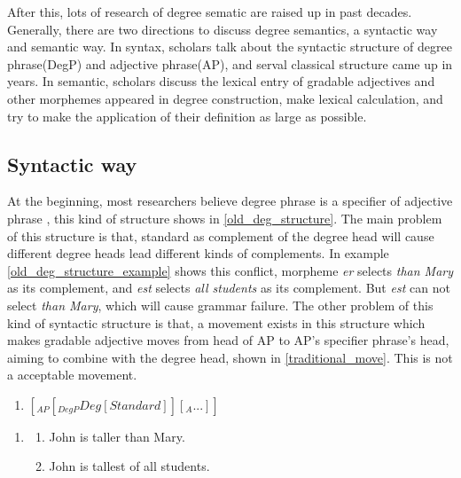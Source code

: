 \documentclass{ctexart}
\let \cite \parencite
\begin{document}
After this, lots of research of degree sematic are raised up in past decades. Generally, there are two directions to discuss degree semantics, a syntactic way and semantic way. In syntax, scholars talk about the syntactic structure of degree phrase(DegP) and adjective phrase(AP), and serval classical structure came up in years. In semantic, scholars discuss the lexical entry of gradable adjectives and other morphemes appeared in degree construction, make lexical calculation, and try to make the application of their definition as large as possible.

\subsection{Syntactic way}

\noindent
At the beginning, most researchers believe degree phrase is a specifier of adjective phrase \cite{chomsky1977,selkirk2015,bresnan1973,heim2000}, this kind of structure shows in \ref{old_deg_structure}. The main problem of this structure is that, standard as complement of the degree head will cause different degree heads lead different kinds of complements. In example \ref{old_deg_structure_example} shows this conflict, morpheme \textit{er} selects \textit{than Mary} as its complement, and \textit{est} selects \textit{all students} as its complement. But \textit{est} can not select \textit{than Mary}, which will cause grammar failure. The other problem of this kind of syntactic structure is that, a movement exists in this structure which makes gradable adjective moves from head of AP to AP's specifier phrase's head, aiming to combine with the degree head, shown in \ref{traditional_move}. This is not a acceptable movement.  

\begin{enumerate}
    \item \label{old_deg_structure} $[_{AP}[_{DegP}Deg[Standard]][_{A}...]]$
\end{enumerate}

\begin{enumerate}
    \item \label{old_deg_structure_example}
    \begin{enumerate}
        \item John is taller than Mary.
        \item John is tallest of all students.
    \end{enumerate}
\end{enumerate}
\end{document}
